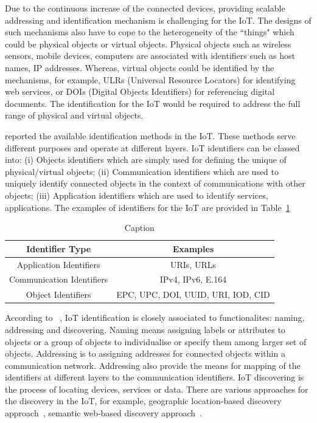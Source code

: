 Due to the continuous increase of the connected devices, providing scalable addressing and identification mechanism is challenging for the IoT. 
The designs of such mechanisms also have to cope to the heterogeneity of the ``things" which could be physical objects or virtual objects. 
Physical objects such as wireless sensors, mobile devices, computers are associated with identifiers such as host names, IP addresses.
Whereas, virtual objects could be identified by the mechanisms, for example, ULRs (Universal Resource Locators) for identifying web services, or DOIs (Digital Objects Identifiers) for referencing digital documents.
The identification for the IoT would be required to address the full range of physical and virtual objects.

\cite{Presser:2016} reported the available identification methods in the IoT. 
These methods serve different purposes and operate at different layers.
IoT identifiers can be classed into: 
(i) Objects identifiers which are simply used for defining the unique of physical/virtual objects;
(ii) Communication identifiers which are used to uniquely identify connected objects in the context of communications with other objects;
(iii) Application identifiers which are used to identify services, applications. 
The examples of identifiers for the IoT are provided in Table~\ref{tab:IoTIds}

\begin{table}[ht!]
    \centering
    \begin{tabular}{ | c | c |}
       \hline
       Identifier Type  &  Examples  \\
       \hline
       Application Identifiers  &  URIs, URLs \\
       \hline
       Communication Identifiers & IPv4, IPv6, E.164 \\
       \hline
       Object Identifiers &  EPC, UPC, DOI, UUID, URI, IOD, CID \\
       \hline
    \end{tabular}
    \caption{Caption}
    \label{tab:IoTIds}
\end{table}    


According to ~\cite{Presser:2016}, IoT identification is closely associated to functionalites: naming, addressing and discovering. 
Naming means assigning labels or attributes to objects or a group of objects to individualise or specify them among larger set of objects.
Addressing is to assigning addresses for connected objects within a communication network.
Addressing also provide the means for mapping of the identifiers at different layers to the communication identifiers.
IoT discovering is the process of locating devices, services or data. 
There are various approaches for the discovery in the IoT, for example, geographic location‐based discovery approach~\citep{Dinh:2017}, semantic web‐based discovery approach~\citep{Serena:2017}.

